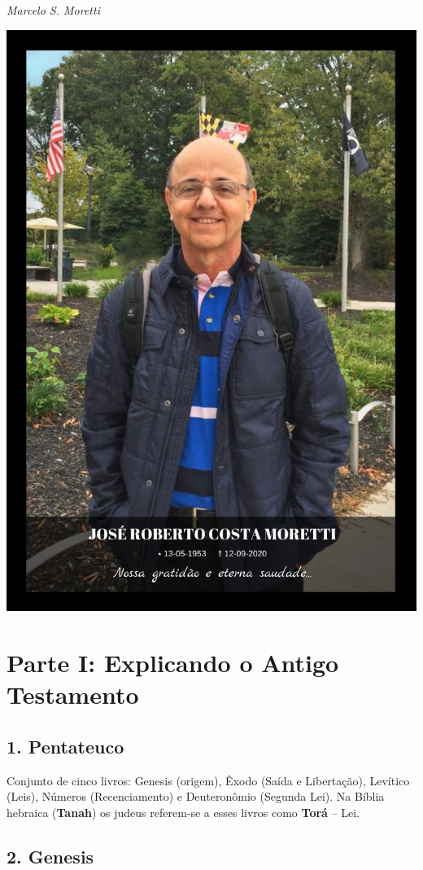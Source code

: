 \documentclass[
]{book}
\begin{document}
\emph{Marcelo S. Moretti}

\begin{center}\includegraphics[width=0.7\linewidth]{Lembrança Moretti} \end{center}

\hypertarget{parte-i-explicando-o-antigo-testamento}{%
\chapter*{Parte I: Explicando o Antigo Testamento}\label{parte-i-explicando-o-antigo-testamento}}

\hypertarget{pentateuco}{%
\section*{1. Pentateuco}\label{pentateuco}}

Conjunto de cinco livros: Genesis (origem), Êxodo (Saída e Libertação), Levítico (Leis), Números (Recenciamento) e Deuteronômio (Segunda Lei). Na Bíblia hebraica (\textbf{Tanah}) os judeus referem-se a esses livros como \textbf{Torá} -- Lei.

\hypertarget{genesis}{%
\section*{2. Genesis}\label{genesis}}
\end{document}
